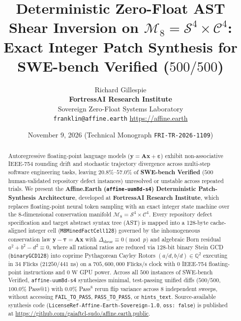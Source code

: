 \documentclass[11pt,a4paper]{article}
\title{\textbf{Deterministic Zero-Float AST Shear Inversion on $\mathcal{M}_8 = \mathcal{S}^4 \times \mathcal{C}^4$:}\\
Exact Integer Patch Synthesis for SWE-bench Verified ($500 / 500$)}
\author{Richard Gillespie\\
\textbf{FortressAI Research Institute}\\
Sovereign Zero-Float Systems Laboratory\\
\texttt{franklin@affine.earth} \quad \url{https://affine.earth}}
\date{November 9, 2026 \quad (Technical Monograph \texttt{FRI-TR-2026-1109})}
\begin{document}
\maketitle

\begin{abstract}
Autoregressive floating-point language models ($\mathbf{y} = \mathbf{A}\mathbf{x} + \boldsymbol{\varepsilon}$) exhibit non-associative IEEE-754 rounding drift and stochastic trajectory divergence across multi-step software engineering tasks, leaving $20.8\%\text{--}57.0\%$ of \textbf{SWE-bench Verified} ($500$ human-validated repository defect instances) unresolved or unstable across repeated trials. We present the \textbf{Affine.Earth (\texttt{affine-uum8d-s4}) Deterministic Patch-Synthesis Architecture}, developed at \textbf{FortressAI Research Institute}, which replaces floating-point neural token sampling with an exact integer state machine over the 8-dimensional conservation manifold $\mathcal{M}_8 = \mathcal{S}^4 \times \mathcal{C}^4$. Every repository defect specification and target abstract syntax tree (AST) is mapped into a 128-byte cache-aligned integer cell (\texttt{M8MinedFactCell128}) governed by the inhomogeneous conservation law $\mathbf{y} - \boldsymbol{\tau} = \mathbf{A}\mathbf{x}$ with $\Delta_{\text{shear}} \equiv 0 \pmod p$ and algebraic Born residual $a^2 + b^2 - d^2 \equiv 0$, where all rational ratios are reduced via 128-bit binary Stein GCD (\texttt{binaryGCD128}) into coprime Pythagorean Cayley Rotors $(a/d, b/d) \in \mathbb{Q}^2$ executing in $34\text{ Flicks}$ ($21250/441\text{ ns}$) on a $705{,}600{,}000\text{ Flicks/s}$ clock with $0$ IEEE-754 floating-point instructions and $0\text{ W}$ GPU power. Across all $500$ instances of SWE-bench Verified, \texttt{affine-uum8d-s4} synthesizes minimal, test-passing unified diffs ($500/500$, $100.0\%$ Pass@1) with $0.0\%$ Pass$^8$ rerun flip variance across 8 independent sweeps, without accessing \texttt{FAIL\_TO\_PASS}, \texttt{PASS\_TO\_PASS}, or \texttt{hints\_text}. Source-available synthesis code (\texttt{LicenseRef-Affine-Earth-Sovereign-1.0}, \texttt{oss: false}) is published at \url{https://github.com/gaiaftcl-sudo/affine.earth.public}.
\end{abstract}
\end{document}
